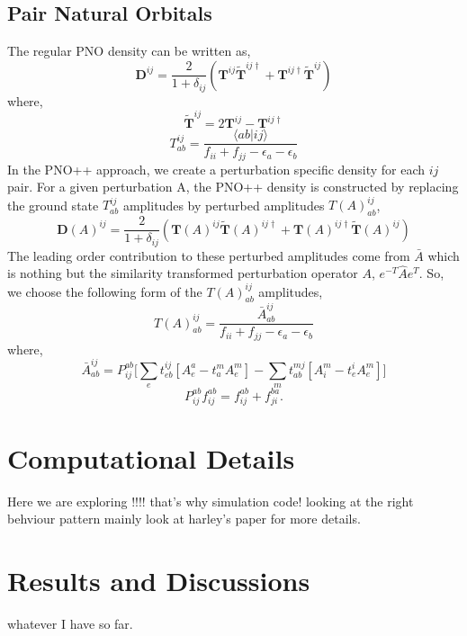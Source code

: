 \subsection{Pair Natural Orbitals}
The regular PNO density can be written as,
\begin{equation}
\bm{D}^{ij} = \frac{2}{1+\delta_{ij}} (\bm{T}^{ij}\tilde{\bm{T}}^{ij\dagger} + \bm{T}^{ij\dagger}\tilde{\bm{T}}^{ij})
\end{equation}
where, 
\begin{equation}
\tilde{\bm{T}}^{ij} = 2\bm{T}^{ij} - \bm{T}^{ij\dagger}
\end{equation} 
\begin{equation}
T^{ij}_{ab} = \frac{\langle ab|ij \rangle}{f_{ii} + f_{jj} - \epsilon_a - \epsilon_b}
\end{equation} 
In the PNO++ approach, we create a perturbation specific density for each $ij$ pair. For a given
perturbation A, the PNO++ density is constructed by replacing the ground state $T^{ij}_{ab}$ amplitudes 
by perturbed amplitudes $T(A)^{ij}_{ab}$,
\begin{equation}
\bm{D}(A)^{ij} = \frac{2}{1+\delta_{ij}} (\bm{T}(A)^{ij}\bm{\tilde{T}}(A)^{ij\dagger} + \bm{T}(A)^{ij\dagger}\bm{\tilde{T}}(A)^{ij})
\end{equation}
The leading order contribution to these perturbed amplitudes come from $\bar{A}$ which is nothing but 
the similarity transformed perturbation operator $A$, $e^{-T}\hat{A}e^{T}$. So, we choose the following
form of the $T(A)^{ij}_{ab}$ amplitudes,
\begin{equation}
T(A)^{ij}_{ab} =  \frac{\bar{A}^{ij}_{ab}}{f_{ii} + f_{jj} - \epsilon_a - \epsilon_b} 
\end{equation} 
where,
\begin{equation}
\bar{A}^{ij}_{ab} = P_{ij}^{ab}\bigg[\sum_e t^{ij}_{eb}[A^a_e - t^m_a A^m_e] -\sum_m t^{mj}_{ab}[A^m_i - t^i_e A^m_e]\bigg]
\end{equation} 
\begin{equation}
P_{ij}^{ab} f_{ij}^{ab} = f_{ij}^{ab} + f_{ji}^{ba} .
\end{equation}
\section{Computational Details}
Here we are exploring !!!! that's why simulation code!
looking at the right behviour pattern mainly
look at harley's paper for more details.
\section{Results and Discussions}
whatever I have so far.

